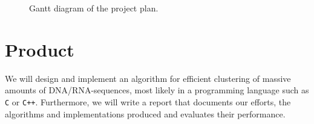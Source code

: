 \documentclass[11pt,a4paper]{article}
\begin{document}
\begin{figure}[H]
  \begin{gantt}[xunitlength=0.5cm,fontsize=\small,titlefontsize=\small]{12}{20}
    \begin{ganttitle}
    \end{ganttitle}
  \end{gantt}
  \caption{Gantt diagram of the project plan.}
  \label{fig:gantt}
\end{figure}


\section{Product}
We will design and implement an algorithm for efficient clustering of massive
amounts of DNA/RNA-sequences, most likely in a programming language such as
\texttt{C} or \texttt{C++}. Furthermore, we will write a report that documents
our efforts, the algorithms and implementations produced and evaluates their
performance.
\end{document}

